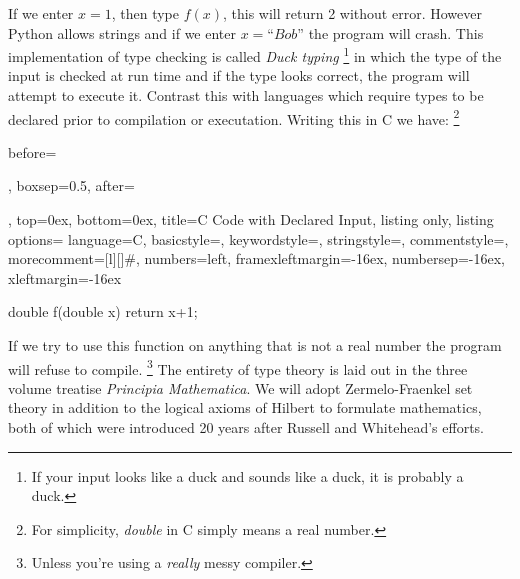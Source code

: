         If we enter $x=1$, then type $f(x)$, this will return 2 without error.
        However Python allows strings and if we enter $x=\textit{``Bob''}$ the
        program will crash. This implementation of type checking is called
        \textit{Duck typing}%
        \footnote{%
            If your input looks like a duck and sounds like a duck, it is
            probably a duck.
        }
        in which the type of the input is checked at run time and if the type
        looks correct, the program will attempt to execute it. Contrast this
        with languages which require types to be declared prior to compilation
        or executation. Writing this in C we have:%
        \footnote{%
            For simplicity, \textit{double} in C simply means a real number.
        }
        \begin{tcblisting}{
            before=\par\vspace{2ex},
            boxsep=0.5\topsep,
            after=\par\vspace{2ex},
            top=0ex,
            bottom=0ex,
            title=C Code with Declared Input,
            listing only,
            listing options={
                language=C,
                basicstyle=\ttfamily,
                keywordstyle=\color{blue}\ttfamily,
                stringstyle=\color{red}\ttfamily,
                commentstyle=\color{green}\ttfamily,
                morecomment={[l][\color{magenta}]{\#}},
                numbers=left,
                framexleftmargin=-16ex,
                numbersep=-16ex,
                xleftmargin=-16ex
            }
        }
            double f(double x)
            {
                return x+1;
            }
        \end{tcblisting}
        If we try to use this function on anything that is not a real number
        the program will refuse to compile.%
        \footnote{%
            Unless you're using a \textit{really} messy compiler.
        }
        The entirety of type theory is laid out in the three volume
        treatise \textit{Principia Mathematica}. We will adopt Zermelo-Fraenkel
        set theory in addition to the logical
        axioms of Hilbert to formulate mathematics, both
        of which were introduced 20 years after Russell and Whitehead's efforts.
